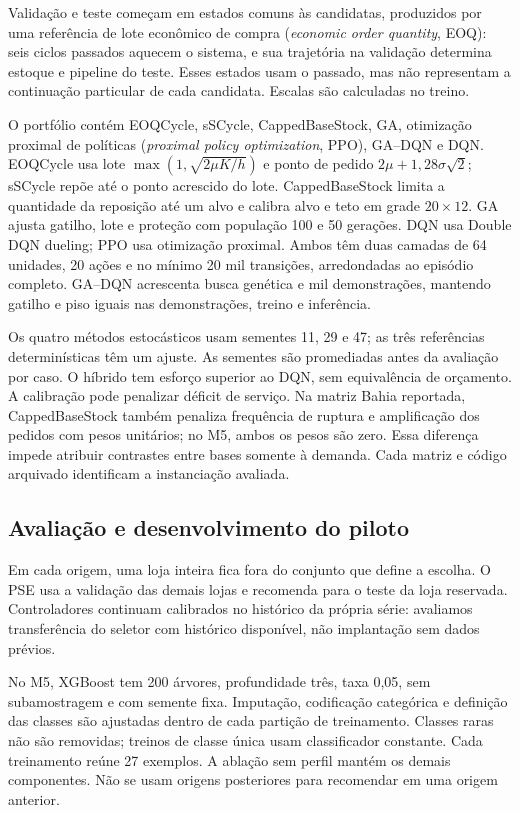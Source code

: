 \documentclass[preprint,12pt]{elsarticle}
\begin{document}
Validação e teste começam em estados comuns às candidatas, produzidos por uma referência de lote econômico de compra (\textit{economic order quantity}, EOQ): seis ciclos passados aquecem o sistema, e sua trajetória na validação determina estoque e pipeline do teste. Esses estados usam o passado, mas não representam a continuação particular de cada candidata. Escalas são calculadas no treino.

O portfólio contém EOQCycle, sSCycle, CappedBaseStock, GA, otimização proximal de políticas (\textit{proximal policy optimization}, PPO), GA--DQN e DQN. EOQCycle usa lote $\max(1,\sqrt{2\mu K/h})$ e ponto de pedido $2\mu+1{,}28\sigma\sqrt2$; sSCycle repõe até o ponto acrescido do lote. CappedBaseStock limita a quantidade da reposição até um alvo e calibra alvo e teto em grade $20\times12$. GA ajusta gatilho, lote e proteção com população 100 e 50 gerações. DQN usa Double DQN dueling; PPO usa otimização proximal. Ambos têm duas camadas de 64 unidades, 20 ações e no mínimo 20 mil transições, arredondadas ao episódio completo. GA--DQN acrescenta busca genética e mil demonstrações, mantendo gatilho e piso iguais nas demonstrações, treino e inferência.

Os quatro métodos estocásticos usam sementes 11, 29 e 47; as três referências determinísticas têm um ajuste. As sementes são promediadas antes da avaliação por caso. O híbrido tem esforço superior ao DQN, sem equivalência de orçamento. A calibração pode penalizar déficit de serviço. Na matriz Bahia reportada, CappedBaseStock também penaliza frequência de ruptura e amplificação dos pedidos com pesos unitários; no M5, ambos os pesos são zero. Essa diferença impede atribuir contrastes entre bases somente à demanda. Cada matriz e código arquivado identificam a instanciação avaliada.

\subsection{Avaliação e desenvolvimento do piloto}
Em cada origem, uma loja inteira fica fora do conjunto que define a escolha. O PSE usa a validação das demais lojas e recomenda para o teste da loja reservada. Controladores continuam calibrados no histórico da própria série: avaliamos transferência do seletor com histórico disponível, não implantação sem dados prévios.

No M5, XGBoost tem 200 árvores, profundidade três, taxa 0,05, sem subamostragem e com semente fixa. Imputação, codificação categórica e definição das classes são ajustadas dentro de cada partição de treinamento. Classes raras não são removidas; treinos de classe única usam classificador constante. Cada treinamento reúne 27 exemplos. A ablação sem perfil mantém os demais componentes. Não se usam origens posteriores para recomendar em uma origem anterior.
\end{document}
